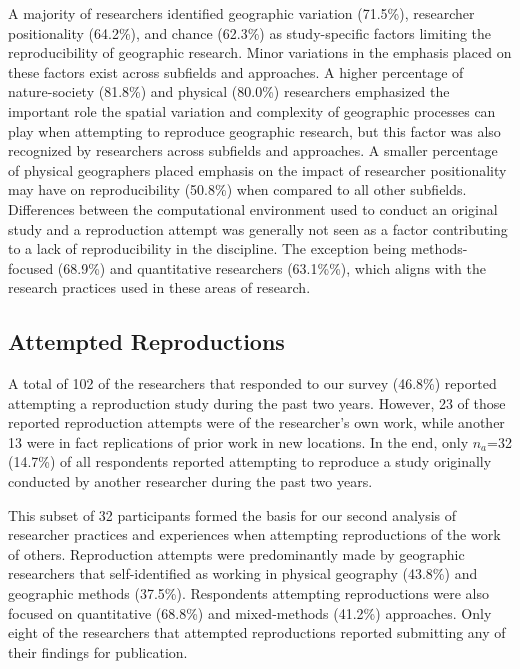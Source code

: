 \documentclass[]{interact}
\theoremstyle{plain}%
\theoremstyle{definition}
\theoremstyle{remark}
\begin{document}
A majority of researchers identified geographic variation (71.5\%), researcher positionality (64.2\%), and chance (62.3\%) as study-specific factors limiting the reproducibility of geographic research.
Minor variations in the emphasis placed on these factors exist across subfields and approaches. 
A higher percentage of nature-society (81.8\%) and physical (80.0\%) researchers emphasized the important role the spatial variation and complexity of geographic processes can play when attempting to reproduce geographic research, but this factor was also recognized by researchers across subfields and approaches. 
A smaller percentage of physical geographers placed emphasis on the impact of researcher positionality may have on reproducibility (50.8\%) when compared to all other subfields.  
Differences between the computational environment used to conduct an original study and a reproduction attempt was generally not seen as a factor contributing to a lack of reproducibility in the discipline. 
The exception being methods-focused (68.9\%) and quantitative researchers (63.1\%\%), which aligns with the research practices used in these areas of research.


\subsection*{Attempted Reproductions}
A total of 102 of the researchers that responded to our survey (46.8\%) reported attempting a reproduction study during the past two years.
However, 23 of those reported reproduction attempts were of the researcher's own work, while another 13 were in fact replications of prior work in new locations.
In the end, only \textit{$n_{a}$}=32 (14.7\%) of all respondents reported attempting to reproduce a study originally conducted by another researcher during the past two years.

This subset of 32 participants formed the basis for our second analysis of researcher practices and experiences when attempting reproductions of the work of others.
Reproduction attempts were predominantly made by geographic researchers that self-identified as working in physical geography (43.8\%) and geographic methods (37.5\%).
Respondents attempting reproductions were also focused on quantitative (68.8\%) and mixed-methods (41.2\%) approaches. 
Only eight of the researchers that attempted reproductions reported submitting any of their findings for publication.
\end{document}
